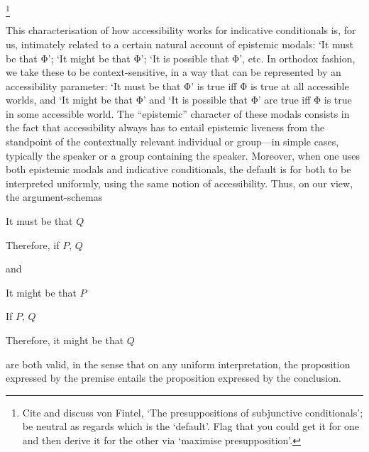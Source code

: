 \documentclass[If.tex]{subfiles}
\begin{document}
%
\footnote{Cite and discuss von Fintel, ‘The presuppositions of subjunctive conditionals’; be neutral as regards which is the ‘default’. Flag that you could get it for one and then derive it for the other via ‘maximise presupposition’.}

This characterisation of how accessibility works for indicative conditionals is, for us, intimately related to a certain natural account of epistemic modals: ‘It must be that Φ’; ‘It might be that Φ’; ‘It is possible that Φ’, etc. In orthodox fashion, we take these to be context-sensitive, in a way that can be represented by an accessibility parameter: ‘It must be that Φ’ is true iff Φ is true at all accessible worlds, and ‘It might be that Φ’ and ‘It is possible that Φ’ are true iff Φ is true in some accessible world. The “epistemic” character of these modals consists in the fact that accessibility always has to entail epistemic liveness from the standpoint of the contextually relevant individual or group---in simple cases, typically the speaker or a group containing the speaker.  Moreover, when one uses both epistemic modals and indicative conditionals, the default is for both to be interpreted uniformly, using the same notion of accessibility.  Thus, on our view, the argument-schemas
\begin{prop}
	\sitem[Must-if]
	It must be that $Q$
	
	Therefore, if $P$, $Q$
\end{prop}
and 
\begin{prop}
	It might be that $P$
	
	If $P$, $Q$
	
	Therefore, it might be that $Q$
\end{prop}
are both valid, in the sense that on any uniform interpretation, the proposition expressed by the premise entails the proposition expressed by the conclusion.  

\end{document}
